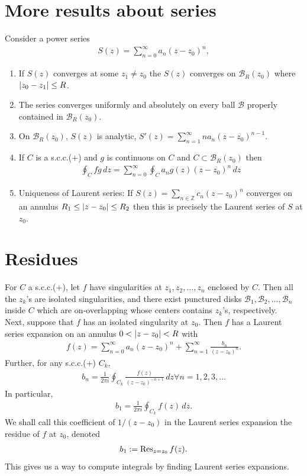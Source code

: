 \documentclass{article}
\theoremstyle{definition}
\newcommand{\f}[2]{\frac{#1}{#2}}
\newcommand{\B}{\mathcal{B}}
\begin{document}
\section{More results about series}
Consider a power series 
\begin{align}
S(z) = \sum^\infty_{n=0} a_n (z - z_0)^n,
\end{align}
\begin{enumerate}
	\item If $S(z)$ converges at some $z_1 \neq z_0$ the $S(z)$ converges on $\B_R(z_0)$ where $\abs{z_0 - z_1} \leq R$. 
	
	\item The series converges uniformly and absolutely on every ball $\B$ properly contained in $\B_R(z_0)$.
	
	\item On $\B_R(z_0)$, $S(z)$ is analytic, $S'(z) = \sum^\infty_{n=1} n a_n(z - z_0)^{n-1}$. 
	
	\item If $C$ is a s.c.c.(+) and $g$ is continuous on $C$ and $C \subset \B_R(z_0)$ then
	\begin{align}
	\oint_C fg\,dz = \sum^\infty_{n=0} \oint_C a_n g(z)(z - z_0)^n\,dz
	\end{align}
	
	\item Uniqueness of Laurent series: If $S(z)= \sum_{n \in \mathbb{Z}} c_n (z - z_0)^n$ converges on an annulus $R_1 \leq \abs{z - z_0} \leq R_2$ then this is precisely the Laurent series of $S$ at $z_0$. 
\end{enumerate}


\section{Residues}
For $C$ a s.c.c.(+), let $f$ have singularities at $z_1, z_2,\dots,z_n$ enclosed by $C$. Then all the $z_k$'s are isolated singularities, and there exist punctured disks $\B_1, \B_2, \dots, \B_n$ inside $C$ which are on-overlapping whose centers contains $z_k$'s, respectively.\\

Next, suppose that $f$ has an isolated singularity at $z_0$. Then $f$ has a Laurent series expansion on an annulus $0 < \abs{z-z_0} < R$ with
\begin{align}
f(z) = \sum^\infty_{n=0}a_n (z - z_0)^n + \sum^\infty_{n=1}\f{b_n}{(z - z_0)^n}.
\end{align}
Further, for any s.c.c.(+) $C_k$,
\begin{align}
b_n = \f{1}{2\pi i} \oint_{C_k} \f{f(z)}{(z - z_0)^{-n+1}}\,dz \forall n = 1,2,3,\dots
\end{align}
In particular, 
\begin{align}
b_1 = \f{1}{2\pi i}\oint_{C_k} f(z)\,dz.
\end{align}
We shall call this coefficient of $1/ (z - z_0)$ in the Laurent series expansion the residue of $f$ at $z_0$, denoted
\begin{align}
b_1 := \Res_{z = z_0} f(z).
\end{align}
This gives us a way to compute integrals by finding Laurent series expansions.
\end{document}

